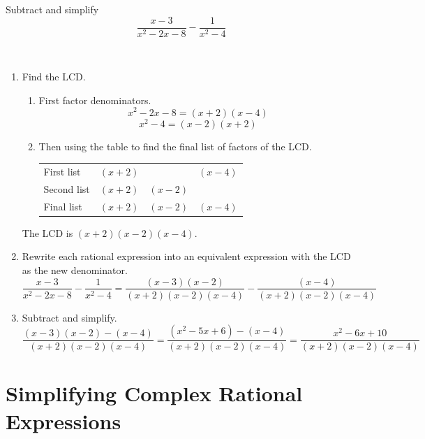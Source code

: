 \documentclass[en,11pt]{elegantbook}
\let\BeginKnitrBlock\begin \let\EndKnitrBlock\end
\begin{document}
\BeginKnitrBlock{example}
\protect\hypertarget{exm:unnamed-chunk-48}{}{\label{exm:unnamed-chunk-48} }
Subtract and simplify\\
\[\dfrac{x-3}{x^2-2x-8}- \dfrac{1}{x^2-4}\]
\EndKnitrBlock{example}

\BeginKnitrBlock{solution}
{}\\

\begin{enumerate}
\def\labelenumi{\arabic{enumi}.}

\item
  Find the LCD.

  \begin{enumerate}
  \def\labelenumii{\arabic{enumii}.}
  \item
    First factor denominators.\\
    \[x^2-2x-8=(x+2)(x-4)\]
    \[x^2-4=(x-2)(x+2)\]
  \item
    Then using the table to find the final list of factors of the LCD.

    \begin{longtable}[]{@{}lccc@{}}
    \toprule
    \endhead
    First list & \((x+2)\) & & \((x-4)\)\tabularnewline
    Second list & \((x+2)\) & \((x-2)\) &\tabularnewline
    Final list & \((x+2)\) & \((x-2)\) & \((x-4)\)\tabularnewline
    \bottomrule
    \end{longtable}
  \end{enumerate}

  The LCD is \((x+2)(x-2)(x-4)\).
\item
  Rewrite each rational expression into an equivalent expression with the LCD as the new denominator.\\
  \[
       \dfrac{x-3}{x^2-2x-8}- \dfrac{1}{x^2-4}=\dfrac{(x-3)(x-2)}{(x+2)(x-2)(x-4)}-\dfrac{(x-4)}{(x+2)(x-2)(x-4)}
   \]
\item
  Subtract and simplify.\\
  \[
       \dfrac{(x-3)(x-2)-(x-4)}{(x+2)(x-2)(x-4)}=\dfrac{(x^2-5x+6)-(x-4)}{(x+2)(x-2)(x-4)}=\dfrac{x^2-6x+10}{(x+2)(x-2)(x-4)}
   \]
\end{enumerate}
\EndKnitrBlock{solution}

\hypertarget{simplifying-complex-rational-expressions}{%
\section{Simplifying Complex Rational Expressions}\label{simplifying-complex-rational-expressions}}
\end{document}
